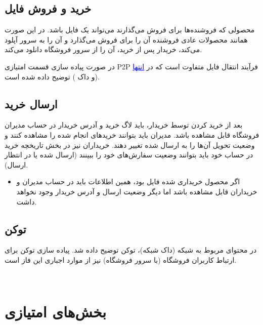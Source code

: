 \documentclass[]{article}
\begin{document}
\subsection*{{\titr خرید و فروش فایل}}

محصولی که فروشنده‌ها برای فروش می‌گذارند می‌تواند یک فایل باشد. در این صورت همانند محصولات عادی فروشنده آن را برای فروش می‌گذارد و آن را به سرور آپلود می‌کند، خریدار پس از خرید، آن را از سرور فروشگاه دانلود می‌کند.
 

 
در صورت پیاده سازی قسمت امتیازی P2P فرآیند انتقال فایل متفاوت است که در  \hyperref[subsec:p2p]{{\textcolor{blue}{\underline{انتها}}}} (\textcolor{CustomColor}{و داک }) توضیح داده شده است.

\subsection*{{\titr ارسال خرید}}

بعد از خرید کردن توسط خریدار، باید لاگ خرید و آدرس خریدار در حساب مدیران فروشگاه قابل مشاهده باشد. مدیران باید بتوانند خرید‌های انجام شده را مشاهده کنند و وضعیت تحویل آن‌ها را به ارسال شده تغییر دهند. خریداران نیز در بخش تاریخچه خرید در حساب خود باید بتوانند وضعیت سفارش‌های خود را ببینند (‌ارسال شده یا در انتظار ارسال).

\begin{itemize}
\item
اگر محصول خریداری شده فایل بود، همین اطلاعات باید در حساب مدیران و خریداران قابل مشاهده باشد اما دیگر وضعیت ارسال و آدرس خریدار وجود نخواهد داشت.
\end{itemize}

\subsection*{{\titr توکن}}

در محتوای مربوط به شبکه (داک شبکه)، توکن توضیح داده شد. پیاده سازی توکن برای ارتباط کاربران فروشگاه (‌با سرور فروشگاه)‌ نیز از موارد اجباری این فاز است.


\newpage


 \Large \textbf{\\
}
\section*{{\titr بخش‌های امتیازی}}
\end{document}
